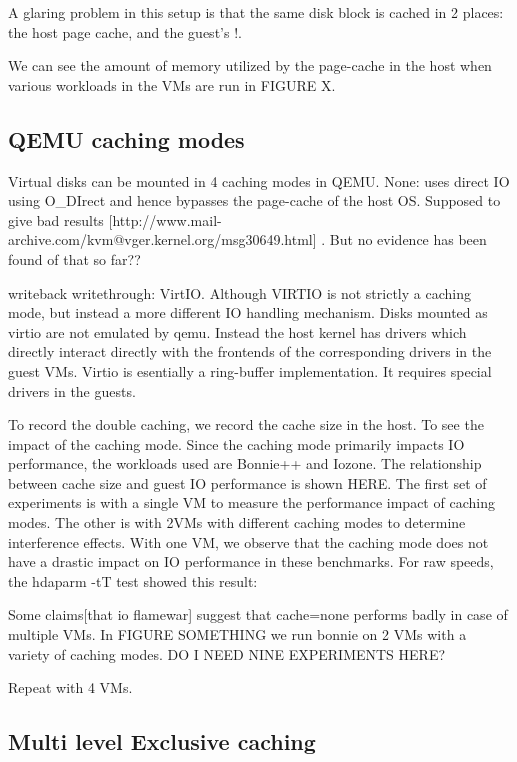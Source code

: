 \documentclass[10pt,a4paper]{article}
\begin{document}
A glaring problem in this setup is that the same disk block is cached in 2 places: the host page cache, and the guest's !.

We can see the amount of memory utilized by the page-cache in the host when various workloads in the VMs are run in FIGURE X.

\subsection {QEMU caching modes}
Virtual disks can be mounted in 4 caching modes in QEMU.
None: uses direct IO using O\_DIrect and hence bypasses the page-cache of the host OS. Supposed to give bad results [http://www.mail-archive.com/kvm@vger.kernel.org/msg30649.html] . But no evidence has been found of that so far??

writeback
writethrough:
VirtIO. Although VIRTIO is not strictly a caching mode, but instead a more different IO handling mechanism. Disks mounted as virtio are not emulated by qemu. Instead the host kernel has drivers which directly interact directly with the frontends of the corresponding drivers in the guest VMs.
Virtio is esentially a ring-buffer implementation. It requires special drivers in the guests. 

To record the double caching, we record the cache size in the host. To see the impact of the caching mode. Since the caching mode primarily impacts IO performance, the workloads used are Bonnie++ and Iozone. The relationship between cache size and guest IO performance is shown HERE. 
The first set of experiments is with a single VM to measure the performance impact of caching modes.
The other is with 2VMs with different caching modes to determine interference effects. 
With one VM, we observe that the caching mode does not have a drastic impact on IO performance in these benchmarks. 
For raw speeds, the hdaparm -tT test showed this result:

Some claims[that io flamewar] suggest that cache=none performs badly in case of multiple VMs. In FIGURE SOMETHING we run bonnie on 2 VMs with a variety of caching modes. 
DO I NEED NINE EXPERIMENTS HERE?

Repeat with 4 VMs. 

\subsection{Multi level Exclusive caching}
\end{document}
